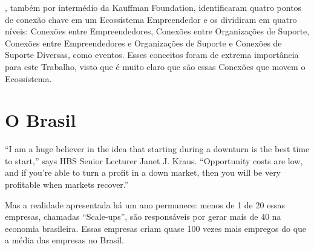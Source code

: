 , também por intermédio da Kauffman Foundation, identificaram quatro pontos de conexão chave em um Ecossistema Empreendedor e os dividiram em quatro níveis: Conexões entre Empreendedores, Conexões entre Organizações de Suporte, Conexões entre Empreendedores e Organizações de Suporte e Conexões de Suporte Diversas, como eventos. Esses conceitos foram de extrema importância para este Trabalho, visto que é muito claro que são essas Conexões que movem o Ecossistema.

\section{O Brasil}

“I am a huge believer in the idea that starting during a downturn is the best time to start,” says HBS Senior Lecturer Janet J. Kraus. “Opportunity costs are low, and if you’re able to turn a profit in a down market, then you will be very profitable when markets recover.”

Mas a realidade apresentada há um ano permanece: menos
de 1%
de 20%
essas empresas, chamadas “Scale-ups”, são
responsáveis por gerar mais de 40%
na economia brasileira. Essas empresas criam quase
100 vezes mais empregos do que a média das empresas
no Brasil.
